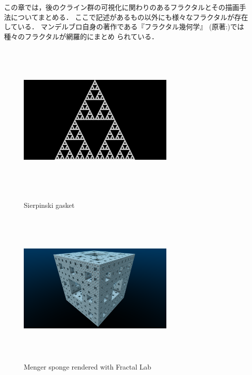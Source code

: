 この章では，後のクライン群の可視化に関わりのあるフラクタルとその描画手
法についてまとめる．
ここで記述があるもの以外にも様々なフラクタルが存在している．
マンデルブロ自身の著作である『フラクタル幾何学』
\cite{mandelbrot-ja-201102-1}
\cite{mandelbrot-ja-201102-2}
(原著:\cite{mandelbrot1983fractal})では種々のフラクタルが網羅的にまとめ
られている．

\begin{figure}[htbp]
 \begin{minipage}{0.5\hsize}
   \center
  \includegraphics[width=3in, height=3in, keepaspectratio]{../img/fractal/gasket.pdf}
  \caption{Sierpinski gasket}
  \label{fig:gasket}
 \end{minipage}
 \begin{minipage}{0.5\hsize}
  \center
  \includegraphics[width=3in, height=3in, keepaspectratio]{../img/fractal/menger.pdf}
  \caption{Menger sponge rendered with Fractal Lab}
  \label{fig:menger}
 \end{minipage}

\end{figure}

